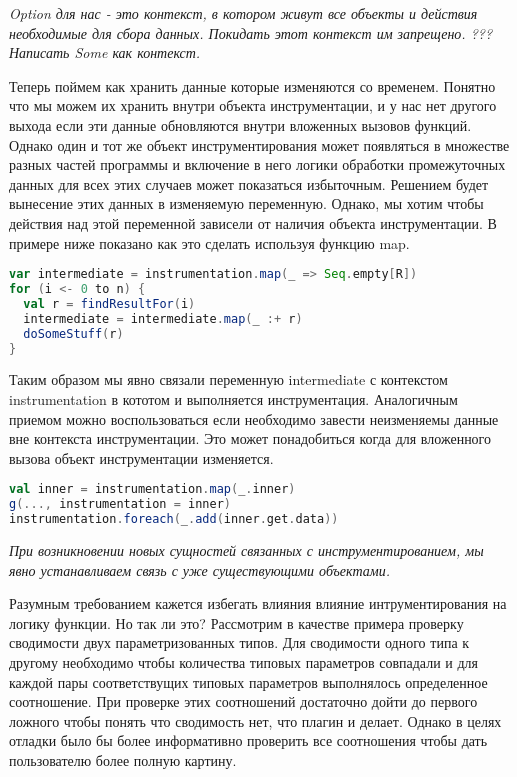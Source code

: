 \textit{
Option для нас - это контекст, в котором живут все объекты и действия необходимые
для сбора данных. Покидать этот контекст им запрещено.
???
Написать Some как контекст.
}

Теперь поймем как хранить данные которые изменяются со временем.
Понятно что мы можем их хранить внутри объекта инструментации, и у нас нет другого
выхода если эти данные обновляются внутри вложенных вызовов функций.
Однако один и тот же объект инструментирования может появляться в множестве разных
частей программы и включение в него логики обработки промежуточных данных для
всех этих случаев может показаться избыточным.
Решением будет вынесение этих данных в изменяемую переменную.
Однако, мы хотим чтобы действия над этой переменной зависели от наличия объекта
инструментации.
В примере ниже показано как это сделать используя функцию map.

\begin{samepage}
\begin{lstlisting}[language=scala,basicstyle=\ttfamily,keywordstyle=\color{red}]
var intermediate = instrumentation.map(_ => Seq.empty[R])
for (i <- 0 to n) {
  val r = findResultFor(i)
  intermediate = intermediate.map(_ :+ r)
  doSomeStuff(r)
}
\end{lstlisting}
\end{samepage}

Таким образом мы явно связали переменную intermediate с контекстом instrumentation
в кототом и выполняется инструментация.
Аналогичным приемом можно воспользоваться если необходимо завести неизменяемы данные
вне контекста инструментации.
Это может понадобиться когда для вложенного вызова объект инструментации изменяется.

\begin{samepage}
\begin{lstlisting}[language=scala,basicstyle=\ttfamily,keywordstyle=\color{red}]
val inner = instrumentation.map(_.inner)
g(..., instrumentation = inner)
instrumentation.foreach(_.add(inner.get.data))
\end{lstlisting}
\end{samepage}

\textit{При возникновении новых сущностей связанных с
инструментированием, мы явно устанавливаем связь с уже существующими объектами.}

Разумным требованием кажется избегать влияния влияние интрументирования на
логику функции.
Но так ли это?
Рассмотрим в качестве примера проверку сводимости двух параметризованных типов.
Для сводимости одного типа к другому необходимо чтобы количества типовых параметров
совпадали и для каждой пары соответствущих типовых параметров выполнялось определенное соотношение.
При проверке этих соотношений достаточно дойти до первого ложного чтобы понять что
сводимость нет, что плагин и делает.
Однако в целях отладки было бы более информативно проверить все соотношения чтобы дать
пользователю более полную картину.

